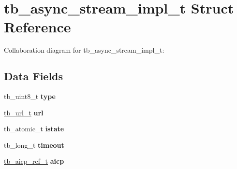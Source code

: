 \hypertarget{structtb__async__stream__impl__t}{\section{tb\-\_\-async\-\_\-stream\-\_\-impl\-\_\-t Struct Reference}
\label{structtb__async__stream__impl__t}
}


Collaboration diagram for tb\-\_\-async\-\_\-stream\-\_\-impl\-\_\-t\-:
\subsection*{Data Fields}
\begin{DoxyCompactItemize}
\item 
\hypertarget{structtb__async__stream__impl__t_a4a4e7d77b427e87e414a8f8274ef072e}{tb\-\_\-uint8\-\_\-t {\bfseries type}}\label{structtb__async__stream__impl__t_a4a4e7d77b427e87e414a8f8274ef072e}

\item 
\hypertarget{structtb__async__stream__impl__t_a254595f357994c633c6c9fa59f0ba8d6}{\hyperlink{structtb__url__t}{tb\-\_\-url\-\_\-t} {\bfseries url}}\label{structtb__async__stream__impl__t_a254595f357994c633c6c9fa59f0ba8d6}

\item 
\hypertarget{structtb__async__stream__impl__t_a62f8e9b4cc6a392799d47b333aaf13de}{tb\-\_\-atomic\-\_\-t {\bfseries istate}}\label{structtb__async__stream__impl__t_a62f8e9b4cc6a392799d47b333aaf13de}

\item 
\hypertarget{structtb__async__stream__impl__t_a6ccb27f22ddb1e37954e466025ebb258}{tb\-\_\-long\-\_\-t {\bfseries timeout}}\label{structtb__async__stream__impl__t_a6ccb27f22ddb1e37954e466025ebb258}

\item 
\hypertarget{structtb__async__stream__impl__t_af6b3fd1b75fcc018b0880893559a0daa}{\hyperlink{structtb__aicp__ref__t}{tb\-\_\-aicp\-\_\-ref\-\_\-t} {\bfseries aicp}}\label{structtb__async__stream__impl__t_af6b3fd1b75fcc018b0880893559a0daa}


\end{DoxyCompactItemize}
